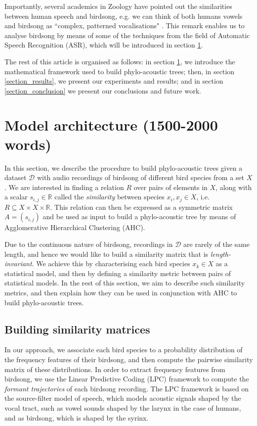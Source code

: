 \documentclass[pdftex,11pt,a4paper]{article}
\theoremstyle{definition}
\theoremstyle{remark}
\begin{document}
\par Importantly, several academics in Zoology have pointed out the similarities between human speech and birdsong, e.g. we can think of both humans vowels and birdsong as ``complex, patterned vocalisations" \cite{Berwick2013,Naguib2014}. This remark enables us to analyse birdsong by means of some of the techniques from the field of Automatic Speech Recognition (ASR), which will be introduced in section \ref{section_model}. 
\par The rest of this article is organised as follows: in section \ref{section_model}, we introduce the mathematical framework used to build phylo-acoustic trees; then, in section \ref{section_results}, we present our experiments and results; and in section \ref{section_conclusion} we present our conclusions and future work.

\section{Model architecture (1500-2000 words)}
\label{section_model}
In this section, we describe the procedure to build phylo-acoustic trees given a dataset $\mathcal{D}$ with audio recordings of birdsong of different bird species from a set $X$. We are interested in finding a relation $R$ over pairs of elements in $X$, along with a scalar $s_{i, j} \in \mathbb{R}$ called the \emph{similarity} between species $x_i, x_j \in X$, i.e. $R \subseteq X \times X \times \mathbb{R}$. This relation can then be expressed as a symmetric matrix $A = (s_{i,j})$ and be used as input to build a phylo-acoustic tree by means of Agglomerative Hierarchical Clustering (AHC). 
\par Due to the continuous nature of birdsong, recordings in $\mathcal{D}$ are rarely of the same length, and hence we would like to build a similarity matrix that is \emph{length-invariant}. We achieve this by characterising each bird species $x_k \in X$ as a statistical model, and then by defining a similarity metric between pairs of statistical models. In the rest of this section, we aim to describe such similarity metrics, and then explain how they can be used in conjunction with AHC to build phylo-acoustic trees.

\subsection{Building similarity matrices}
In our approach, we associate each bird species to a probability distribution of the frequency features of their birdsong, and then compute the pairwise similarity matrix of these distributions. In order to extract frequency features from birdsong, we use the Linear Predictive Coding (LPC) framework to compute the \emph{formant trajectories} of each birdsong recording. The LPC framework is based on the source-filter model of speech, which models acoustic signals shaped by the vocal tract, such as vowel sounds shaped by the larynx in the case of humans, and as birdsong, which is shaped by the syrinx.
\end{document}
